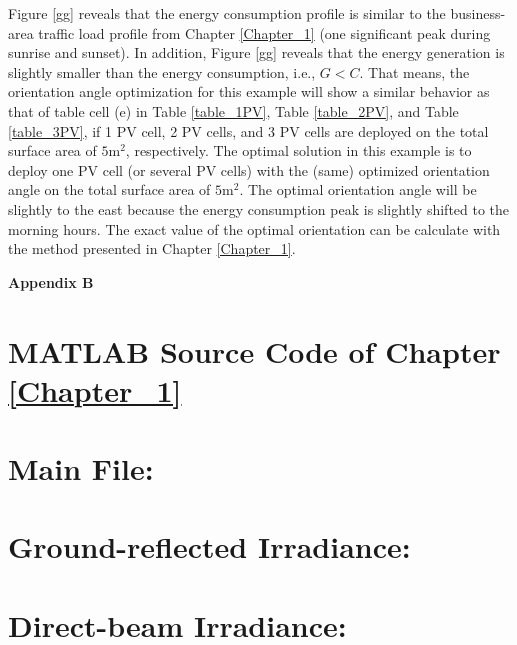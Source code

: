 Figure \ref{gg} reveals that the energy consumption profile is similar to the business-area traffic load profile from Chapter \ref{Chapter_1} (one significant peak during sunrise and sunset). In addition, Figure \ref{gg} reveals that the energy generation is slightly smaller than the energy consumption, i.e., $G<C$. That means, the orientation angle optimization for this example will show a similar behavior as that of table cell (e) in Table \ref{table_1PV}, Table \ref{table_2PV}, and Table \ref{table_3PV}, if 1 PV cell, 2 PV cells, and 3 PV cells are deployed on the total surface area of $5\mathrm{m^2}$, respectively. 
The optimal solution in this example is to deploy one PV cell (or several PV cells) with the (same) optimized orientation angle on the total surface area of $5\mathrm{m^2}$. The optimal orientation angle will be slightly to the east because the energy consumption peak is slightly shifted to the morning hours. The exact value of the optimal orientation can be calculate with the method presented in Chapter \ref{Chapter_1}. 

\newpage 



\begin{center}

  \begin{center}{
   \Huge \bf Appendix B}
  \end{center}

\vspace{-1cm}
\section*{MATLAB Source Code of Chapter \ref{Chapter_1} \cite{DOBEN_GITHUB}}
\end{center}

		\section*{Main File:}
		\scriptsize
		
		
		\section*{Ground-reflected Irradiance:}
		
		
		\section*{Direct-beam Irradiance:}
		
				
